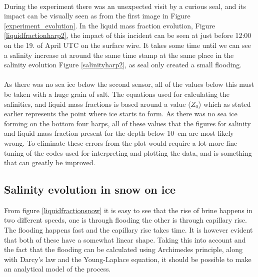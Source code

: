 \\
During the experiment there was an unexpected visit by a curious seal, and its impact can be visually seen as from the first image in Figure \autoref{experiment_evolution}. In the liquid mass fraction evolution, Figure \autoref{liquidfractionharp2}, the impact of this incident can be seen at just before 12:00 on the 19. of April UTC on the surface wire. It takes some time until we can see a salinity increase at around the same time stamp at the same place in the salinity evolution Figure \autoref{salinityharp2}, as seal only created a small flooding.\\
\\ 
As there was no sea ice below the second sensor, all of the values below this must be taken with a huge grain of salt. The equations used for calculating the salinities, and liquid mass fractions is based around a value ($Z_0$) which as stated earlier represents the point where ice starts to form. As there was no sea ice forming on the bottom four harps, all of these values that the figures for salinity and liquid mass fraction present for the depth below \SI{10}{cm} are most likely wrong. To eliminate these errors from the plot would require a lot more fine tuning of the codes used for interpreting and plotting the data, and is something that can greatly be improved. 



\subsection{Salinity evolution in snow on ice}

From figure \autoref{liquidfractionsnow} it is easy to see that the rise of brine happens in two different speeds, one is through flooding the other is through capillary rise. The flooding happens fast and the capillary rise takes time. It is however evident that both of these have a somewhat linear shape. Taking this into account and the fact that the flooding can be calculated using Archimedes principle, along with Darcy's law and the Young-Laplace equation, it should be possible to make an analytical model of the process.\\
\vspace{0.4cm} 

